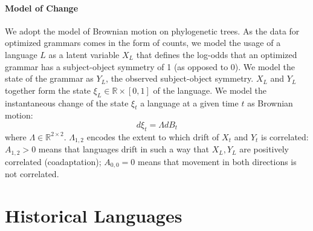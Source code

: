 \documentclass[11pt,a4paper]{article}
\begin{document}
\paragraph{Model of Change}



We adopt the model of Brownian motion on phylogenetic trees.
As the data for optimized grammars comes in the form of counts, we model the usage of a language $L$ as a latent variable $X_L$ that defines the log-odds that an optimized grammar has a subject-object symmetry of 1 (as opposed to 0).
We model the state of the grammar as $Y_L$, the observed subject-object symmetry.
$X_L$ and $Y_L$ together form the state $\xi_L \in \mathbb{R} \times [0,1]$  of the language.
We model the instantaneous change of the state $\xi_t$ a language at a given time $t$ as Brownian motion:
\begin{equation*}
    d\xi_t = \Lambda dB_t
\end{equation*}
where $\Lambda \in \mathbb{R}^{2\times 2}$.
$\Lambda_{1,2}$ encodes the extent to which drift of $X_t$ and $Y_t$ is correlated:
$A_{1,2} > 0$ means that languages drift in such a way that $X_L, Y_L$ are positively correlated (coadaptation); $A_{0,0} = 0$ means that movement in both directions is not correlated.





\appendix

\section{Historical Languages}
\end{document}
